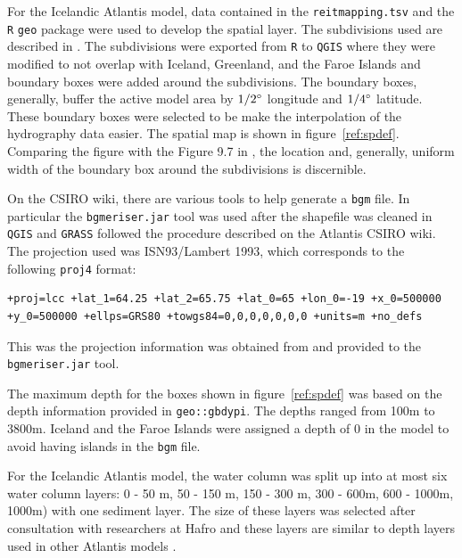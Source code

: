 \documentclass{report}
\begin{document}
For the Icelandic Atlantis model, data contained in the \texttt{reitmapping.tsv} and the \texttt{R} \texttt{geo} package were used to develop the spatial layer. The subdivisions used are described in \cite{dst2}. The subdivisions were exported from \texttt{R} to \texttt{QGIS} where they were modified to not overlap with Iceland, Greenland, and the Faroe Islands and boundary boxes were added around the subdivisions. The boundary boxes, generally, buffer the active model area by $1/2\degree$ longitude and $1/4\degree$ latitude. These boundary boxes were selected to be make the interpolation of the hydrography data easier. The spatial map is shown in figure~\ref{ref:spdef}. Comparing the figure with the Figure 9.7 in \cite{dst2}, the location and, generally, uniform width of the boundary box around the subdivisions is discernible. 

On the CSIRO wiki, there are various tools to help generate a \texttt{bgm} file. In particular the \texttt{bgmeriser.jar} tool was used after the shapefile was cleaned in \texttt{QGIS} and \texttt{GRASS} followed the procedure described on the Atlantis CSIRO wiki. The projection used was ISN93/Lambert 1993, which corresponds to the following \texttt{proj4} format:   

\begin{small}
\begin{verbatim}
+proj=lcc +lat_1=64.25 +lat_2=65.75 +lat_0=65 +lon_0=-19 +x_0=500000 
+y_0=500000 +ellps=GRS80 +towgs84=0,0,0,0,0,0,0 +units=m +no_defs 
\end{verbatim}
\end{small}

This was the projection information was obtained from \cite{proj4iceland} and provided to the \texttt{bgmeriser.jar} tool.

 The maximum depth for the boxes shown in figure~\ref{ref:spdef} was based on the depth information provided in \texttt{geo::gbdypi}. The depths ranged from 100m to 3800m. Iceland and the Faroe Islands were assigned a depth of 0 in the model to avoid having islands in the \texttt{bgm} file.
 
 For the Icelandic Atlantis model, the water column was split up into at most six water column layers: 0 - 50 m, 50 - 150 m, 150 - 300 m, 300 - 600m, 600 - 1000m, 1000m) with one sediment layer. The size of these layers was selected after consultation with researchers at Hafro and these layers are similar to depth layers used in other Atlantis models \cite{link2010northeast, savina2008ecologically}.
\end{document}
